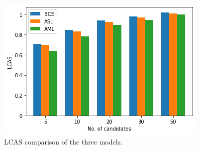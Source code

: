 \begin{figure}
    \centering
    \includegraphics[width=.6\textwidth]{figures/evaluation/all_lcas.png}
    \caption{LCAS comparison of the three models.}
    \label{fig:all_lcas}
\end{figure}